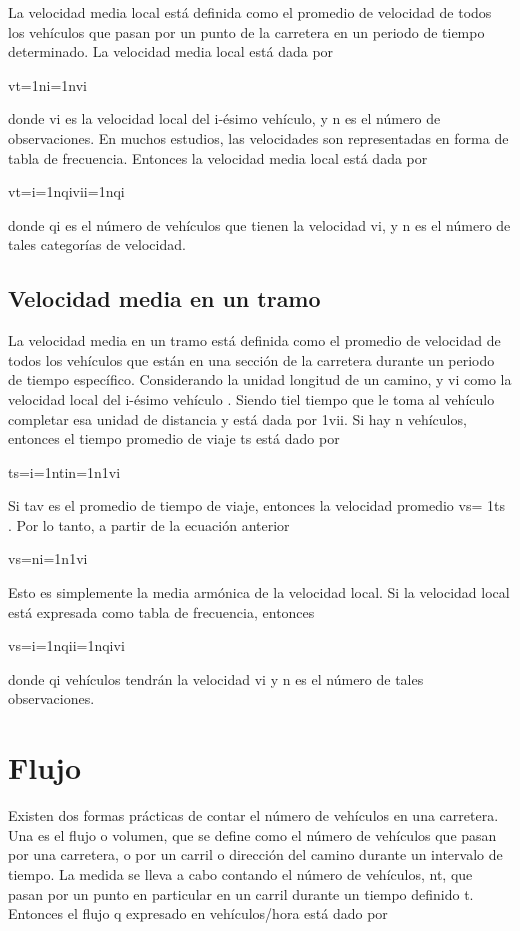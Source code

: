 \documentclass[final,fmstyle]{fpunathesis}
\begin{document}
La velocidad media local está definida como el promedio de velocidad de todos los vehículos que pasan por un punto de la carretera en un periodo de tiempo determinado. La velocidad media local está dada por

vt=1ni=1nvi

donde vi es la velocidad local del i-ésimo vehículo, y n es el número de observaciones. En  muchos estudios, las velocidades son representadas en forma de tabla de frecuencia. Entonces la velocidad media local está dada por

vt=i=1nqivii=1nqi

donde qi es el número de vehículos que tienen la velocidad vi, y n es el número de tales categorías de velocidad.

\subsection{Velocidad media en un tramo}

La velocidad media en un tramo está definida como el promedio de velocidad de todos los vehículos que están en una sección de la carretera durante un periodo de tiempo específico. Considerando la unidad longitud de un camino, y vi como la velocidad local del i-ésimo vehículo . Siendo tiel tiempo que le toma al vehículo completar esa unidad de distancia y está dada por 1vii. Si hay n vehículos, entonces el tiempo promedio de viaje ts está dado por

ts=i=1ntin=1n1vi

Si tav es el promedio de tiempo de viaje, entonces la velocidad promedio vs= 1ts . Por lo tanto, a partir de la ecuación anterior

vs=ni=1n1vi

Esto es simplemente la media armónica de la velocidad local. Si la velocidad local está expresada como tabla de frecuencia, entonces

vs=i=1nqii=1nqivi

donde qi vehículos tendrán la velocidad vi y n es el número de tales observaciones.

\section{Flujo}

Existen dos formas prácticas de contar el número de vehículos en una carretera. Una es el flujo o volumen, que se define como el número de vehículos que pasan por una carretera, o por un carril o dirección del camino durante un intervalo de tiempo. La medida se lleva a cabo contando el número de vehículos, nt, que pasan por un punto en particular en un carril durante un tiempo definido t. Entonces el flujo q expresado en vehículos/hora está dado por
\end{document}
